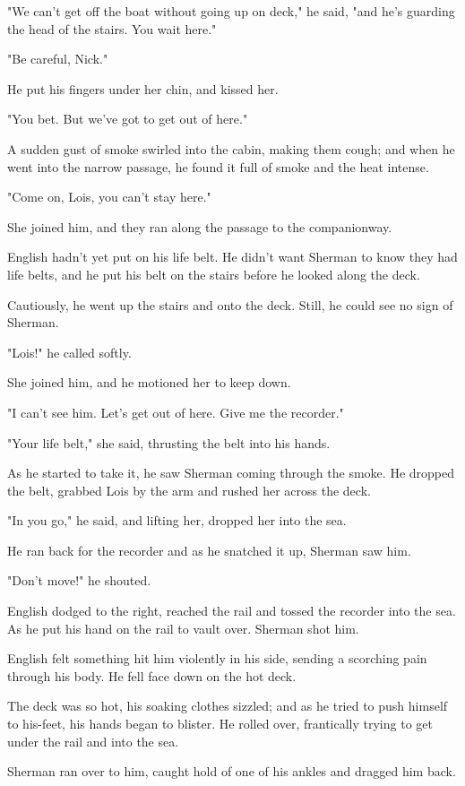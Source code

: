 \documentclass{novel}
\begin{document}
"We can't get off the boat without going up on deck," he said, "and he's guarding the head of the stairs. You wait here."

"Be careful, Nick."

He put his fingers under her chin, and kissed her.

"You bet. But we've got to get out of here."

A sudden gust of smoke swirled into the cabin, making them cough; and when he went into the narrow passage, he found it full of smoke and the heat intense.

"Come on, Lois, you can't stay here."

She joined him, and they ran along the passage to the companionway.

English hadn't yet put on his life belt. He didn't want Sherman to know they had life belts, and he put his belt on the stairs before he looked along the deck.

Cautiously, he went up the stairs and onto the deck. Still, he could see no sign of Sherman.

"Lois!" he called softly.

She joined him, and he motioned her to keep down.

"I can't see him. Let's get out of here. Give me the recorder."

"Your life belt," she said, thrusting the belt into his hands.

As he started to take it, he saw Sherman coming through the smoke. He dropped the belt, grabbed Lois by the arm and rushed her across the deck.

"In you go," he said, and lifting her, dropped her into the sea.

He ran back for the recorder and as he snatched it up, Sherman saw him.

"Don't move!" he shouted.

English dodged to the right, reached the rail and tossed the recorder into the sea. As he put his hand on the rail to vault over. Sherman shot him.

English felt something hit him violently in his side, sending a scorching pain through his body. He fell face down on the hot deck.

The deck was so hot, his soaking clothes sizzled; and as he tried to push himself to his-feet, his hands began to blister. He rolled over, frantically trying to get under the rail and into the sea.

Sherman ran over to him, caught hold of one of his ankles and dragged him back.
\end{document}
